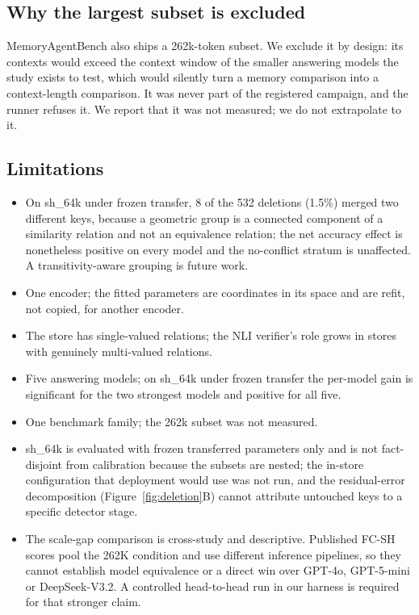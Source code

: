 \documentclass[journal=jcisd8,manuscript=article]{achemso}
\begin{document}
\subsection{Why the largest subset is excluded}

MemoryAgentBench also ships a 262k-token subset. We exclude it by design: its contexts would exceed the context window of the smaller answering models the study exists to test, which would silently turn a memory comparison into a context-length comparison. It was never part of the registered campaign, and the runner refuses it. We report that it was not measured; we do not extrapolate to it.

\subsection{Limitations}
\label{sec:limitations}

\begin{itemize}
\item On sh\_64k under frozen transfer, 8 of the 532 deletions (1.5\%) merged two different keys, because a geometric group is a connected component of a similarity relation and not an equivalence relation; the net accuracy effect is nonetheless positive on every model and the no-conflict stratum is unaffected. A transitivity-aware grouping is future work.
\item One encoder; the fitted parameters are coordinates in its space and are refit, not copied, for another encoder.
\item The store has single-valued relations; the NLI verifier's role grows in stores with genuinely multi-valued relations.
\item Five answering models; on sh\_64k under frozen transfer the per-model gain is significant for the two strongest models and positive for all five.
\item One benchmark family; the 262k subset was not measured.
\item sh\_64k is evaluated with frozen transferred parameters only and is not fact-disjoint from calibration because the subsets are nested; the in-store configuration that deployment would use was not run, and the residual-error decomposition (Figure~\ref{fig:deletion}B) cannot attribute untouched keys to a specific detector stage.
\item The scale-gap comparison is cross-study and descriptive. Published FC-SH scores pool   the 262K condition and use different inference pipelines, so they cannot establish   model equivalence or a direct win over GPT-4o, GPT-5-mini or DeepSeek-V3.2. A   controlled head-to-head run in our harness is required for that stronger claim.
\end{itemize}
\end{document}
